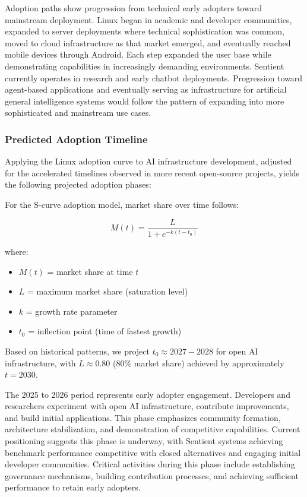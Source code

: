 Adoption paths show progression from technical early adopters toward mainstream deployment. Linux began in academic and developer communities, expanded to server deployments where technical sophistication was common, moved to cloud infrastructure as that market emerged, and eventually reached mobile devices through Android. Each step expanded the user base while demonstrating capabilities in increasingly demanding environments. Sentient currently operates in research and early chatbot deployments. Progression toward agent-based applications and eventually serving as infrastructure for artificial general intelligence systems would follow the pattern of expanding into more sophisticated and mainstream use cases.

\subsubsection{Predicted Adoption Timeline}

Applying the Linux adoption curve to AI infrastructure development, adjusted for the accelerated timelines observed in more recent open-source projects, yields the following projected adoption phases:

For the S-curve adoption model, market share over time follows:

\begin{equation}
M(t) = \frac{L}{1 + e^{-k(t-t_0)}}
\label{eq:scurve}
\end{equation}

where:
\begin{itemize}
    \item $M(t)$ = market share at time $t$
    \item $L$ = maximum market share (saturation level)
    \item $k$ = growth rate parameter
    \item $t_0$ = inflection point (time of fastest growth)
\end{itemize}

Based on historical patterns, we project $t_0 \approx 2027{-}2028$ for open AI infrastructure, with $L \approx 0.80$ (80\% market share) achieved by approximately $t = 2030$.

The 2025 to 2026 period represents early adopter engagement. Developers and researchers experiment with open AI infrastructure, contribute improvements, and build initial applications. This phase emphasizes community formation, architecture stabilization, and demonstration of competitive capabilities. Current positioning suggests this phase is underway, with Sentient systems achieving benchmark performance competitive with closed alternatives and engaging initial developer communities. Critical activities during this phase include establishing governance mechanisms, building contribution processes, and achieving sufficient performance to retain early adopters.

